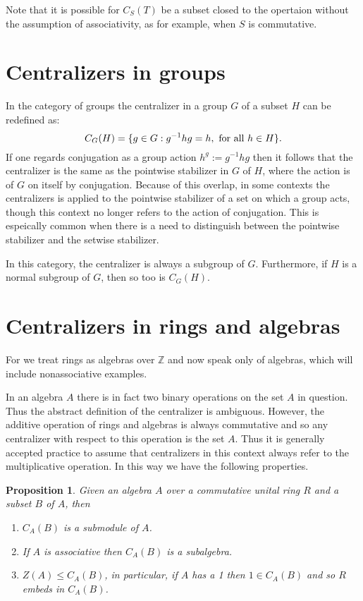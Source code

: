 \documentclass[12pt]{article}
\newtheorem{prop}[thm]{Proposition}
\begin{document}
Note that it is possible for $C_S(T)$ be a subset closed to the opertaion without the 
assumption of associativity, as for example, when $S$ is commutative.


\section{Centralizers in groups}

In the category of groups the centralizer in a group $G$ of a subset $H$ can be redefined as:
\begin{equation*}
   C_G(H)=\{ g\in G : g^{-1} h g=h, \textnormal{ for all } h\in H\}.
\end{equation*}
If one regards conjugation as a group action $h^g:=g^{-1} hg$ then it follows that the
centralizer is the same as the pointwise stabilizer in $G$ of $H$, where the action is
of $G$ on itself by conjugation.  Because of this overlap, in some contexts the 
centralizers is applied to the pointwise stabilizer of a set on which a group acts, 
though this context no longer refers to the action of conjugation.  This
is espeically common when there is a need to distinguish between the pointwise stabilizer
and the setwise stabilizer.

In this category, the centralizer is always a subgroup of $G$.  Furthermore, if $H$ is a normal
subgroup of $G$, then so too is $C_G(H)$.

\section{Centralizers in rings and algebras}

For  we treat rings as algebras over $\mathbb{Z}$ and now speak only of
algebras, which will include nonassociative examples.

In an algebra $A$ there is in fact two binary operations on the set $A$ in
question.  Thus the abstract definition of the centralizer is ambiguous.  However, the additive
operation of rings and algebras is always commutative and so any centralizer with respect to this
operation is the  set $A$.  Thus it is generally accepted practice to assume that centralizers
in this context always refer to the multiplicative operation.  In this way we have the following
properties.

\begin{prop}
Given an algebra $A$ over a commutative unital ring $R$ and a subset $B$ of $A$, then
\begin{enumerate}
\item $C_A(B)$ is a submodule of $A$.
\item If $A$ is associative then $C_A(B)$ is a subalgebra.
\item $Z(A)\leq C_A(B)$, in particular, if $A$ has a 1 then $1\in C_A(B)$ and so
$R$ embeds in $C_A(B)$.
\end{enumerate}
\end{prop}
\end{document}
